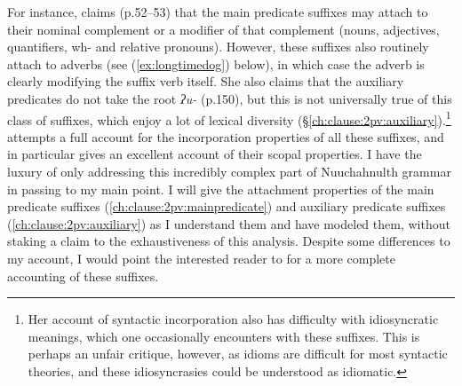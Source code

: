 For instance, \citeauthor{wojdak2005} claims (p.52--53) that the main predicate suffixes may attach to their nominal complement or a modifier of that complement (nouns, adjectives, quantifiers, wh- and relative pronouns). However, these suffixes also routinely attach to adverbs (see (\ref{ex:longtimedog}) below), in which case the adverb is clearly modifying the suffix verb itself. %
She also claims that the auxiliary predicates do not take the root \textit{ʔu-} (p.150), but this is not universally true of this class of suffixes, which enjoy a lot of lexical diversity (\S\ref{ch:clause:2pv:auxiliary}).\footnote{Her account of syntactic incorporation also has difficulty with idiosyncratic meanings, which one occasionally encounters with these suffixes. This is perhaps an unfair critique, however, as idioms are difficult for most syntactic theories, and these idiosyncrasies could be understood as idiomatic.} \citeauthor{wojdak2005} attempts a full account for the incorporation properties of all these suffixes, and in particular gives an excellent account of their scopal properties. I have the luxury of only addressing this incredibly complex part of Nuuchahnulth grammar in passing to my main point. I will give the attachment properties of the main predicate suffixes (\ref{ch:clause:2pv:mainpredicate}) and auxiliary predicate suffixes (\ref{ch:clause:2pv:auxiliary}) as I understand them and have modeled them, without staking a claim to the exhaustiveness of this analysis. Despite some differences to my account, I would point the interested reader to \cite{wojdak2005} for a more complete accounting of these suffixes.


